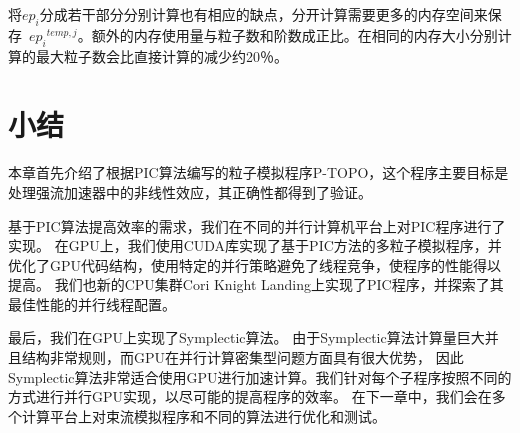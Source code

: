 将$e{{p}_{i}}$分成若干部分分别计算也有相应的缺点，分开计算需要更多的内存空间来保存~${e{{p}_{i}}^{temp,j}}$。额外的内存使用量与粒子数和阶数成正比。在相同的内存大小分别计算的最大粒子数会比直接计算的减少约20％。

\section{小结}                            \label{section:Code_conclusion}
本章首先介绍了根据PIC算法编写的粒子模拟程序P-TOPO，这个程序主要目标是处理强流加速器中的非线性效应，其正确性都得到了验证。

基于PIC算法提高效率的需求，我们在不同的并行计算机平台上对PIC程序进行了实现。
在GPU上，我们使用CUDA库实现了基于PIC方法的多粒子模拟程序，并优化了GPU代码结构，使用特定的并行策略避免了线程竞争，使程序的性能得以提高。
我们也新的CPU集群Cori Knight Landing上实现了PIC程序，并探索了其最佳性能的并行线程配置。

最后，我们在GPU上实现了Symplectic算法。
由于Symplectic算法计算量巨大并且结构非常规则，而GPU在并行计算密集型问题方面具有很大优势，
因此Symplectic算法非常适合使用GPU进行加速计算。我们针对每个子程序按照不同的方式进行并行GPU实现，以尽可能的提高程序的效率。
在下一章中，我们会在多个计算平台上对束流模拟程序和不同的算法进行优化和测试。